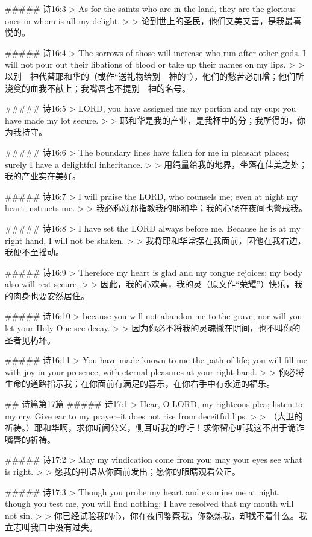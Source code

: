 ##### 诗16:3
> As for the saints who are in the land, they are the glorious ones in whom is all my delight.
>
> 论到世上的圣民，他们又美又善，是我最喜悦的。


##### 诗16:4
> The sorrows of those will increase who run after other gods. I will not pour out their libations of blood or take up their names on my lips.
>
> 以别　神代替耶和华的（或作“送礼物给别　神的”），他们的愁苦必加增；他们所浇奠的血我不献上；我嘴唇也不提别　神的名号。


##### 诗16:5
> LORD, you have assigned me my portion and my cup; you have made my lot secure.
>
> 耶和华是我的产业，是我杯中的分；我所得的，你为我持守。


##### 诗16:6
> The boundary lines have fallen for me in pleasant places; surely I have a delightful inheritance.
>
> 用绳量给我的地界，坐落在佳美之处；我的产业实在美好。


##### 诗16:7
> I will praise the LORD, who counsels me; even at night my heart instructs me.
>
> 我必称颂那指教我的耶和华；我的心肠在夜间也警戒我。


##### 诗16:8
> I have set the LORD always before me. Because he is at my right hand, I will not be shaken.
>
> 我将耶和华常摆在我面前，因他在我右边，我便不至摇动。


##### 诗16:9
> Therefore my heart is glad and my tongue rejoices; my body also will rest secure,
>
> 因此，我的心欢喜，我的灵（原文作“荣耀”）快乐，我的肉身也要安然居住。


##### 诗16:10
> because you will not abandon me to the grave, nor will you let your Holy One see decay.
>
> 因为你必不将我的灵魂撇在阴间，也不叫你的圣者见朽坏。


##### 诗16:11
> You have made known to me the path of life; you will fill me with joy in your presence, with eternal pleasures at your right hand.
>
> 你必将生命的道路指示我；在你面前有满足的喜乐，在你右手中有永远的福乐。


## 诗篇第17篇
##### 诗17:1
> Hear, O LORD, my righteous plea; listen to my cry. Give ear to my prayer--it does not rise from deceitful lips.
>
> （大卫的祈祷。）耶和华啊，求你听闻公义，侧耳听我的呼吁！求你留心听我这不出于诡诈嘴唇的祈祷。


##### 诗17:2
> May my vindication come from you; may your eyes see what is right.
>
> 愿我的判语从你面前发出；愿你的眼睛观看公正。


##### 诗17:3
> Though you probe my heart and examine me at night, though you test me, you will find nothing; I have resolved that my mouth will not sin.
>
> 你已经试验我的心，你在夜间鉴察我，你熬炼我，却找不着什么。我立志叫我口中没有过失。


